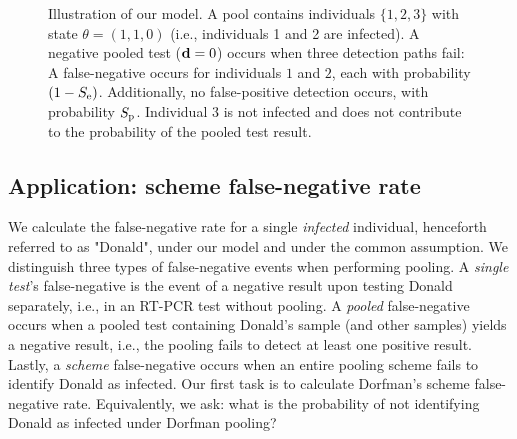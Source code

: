 \documentclass{article}
\begin{document}
\begin{figure}[H]
  \centering
  \caption{Illustration of our model. A pool contains individuals
    $\{1,2,3\}$ with state $\theta=(1,1,0)$ (i.e., individuals 1 and 2
    are infected). A negative pooled test ($\mathbf{d}=0$) occurs when
    three detection paths fail: A false-negative occurs for
    individuals $1$ and $2$, each with probability $(1-S_{\text{e}})$.
    Additionally, no false-positive detection occurs, with probability
    $S_{\text{p}}$. Individual $3$ is not infected and does not contribute to
    the probability of the pooled test result.}\label{fig:likelihood}
\end{figure}


\subsection*{Application: scheme false-negative rate}
We calculate the false-negative rate for a single \emph{infected}
individual, henceforth referred to as "Donald", under our model and
under the common assumption. We distinguish three types of
false-negative events when performing pooling. A \emph{single test}'s
false-negative is the event of a negative result upon testing Donald
separately, i.e., in an RT-PCR test without pooling. A \emph{pooled}
false-negative occurs when a pooled test containing Donald's sample
(and other samples) yields a negative result, i.e., the pooling fails
to detect at least one positive result. Lastly, a \emph{scheme}
false-negative occurs when an entire pooling scheme fails to identify
Donald as infected. Our first task is to calculate Dorfman's scheme
false-negative rate. Equivalently, we ask: what is the probability of
not identifying Donald as infected under Dorfman pooling?
\end{document}
